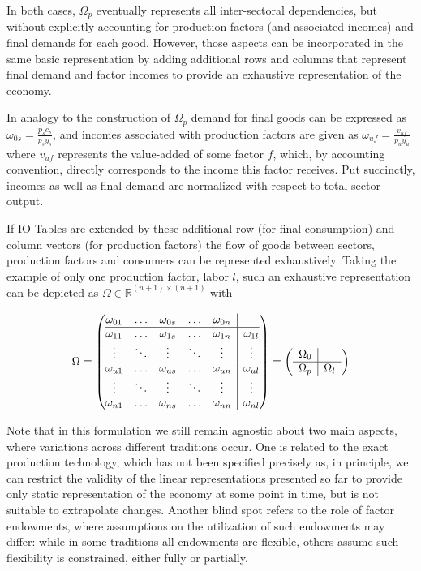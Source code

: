 \documentclass{article}
\begin{document}
In both cases, $\Omega_p$ eventually represents all inter-sectoral dependencies, but without explicitly accounting for production factors (and associated incomes) and final demands for each good. However, those aspects can be incorporated in the same basic representation by adding additional rows and columns that represent final demand and factor incomes to provide an exhaustive representation of the economy. 

In analogy to the construction of $\Omega_p$ demand for final goods can be expressed as $\omega_{0s}=\frac{p_s c_s}{p_s y_s}$, and incomes associated with production factors are given as $\omega_{uf}=\frac{v_{uf}}{p_u y_u}$ where $v_{uf}$ represents the value-added of some factor $f$, which, by accounting convention, directly corresponds to the income this factor receives. Put succinctly, incomes as well as final demand are normalized with respect to total sector output. 

If IO-Tables are extended by these additional row (for final consumption) and column vectors (for production factors) the flow of goods between sectors, production factors and consumers can be represented exhaustively. 
Taking the example of only one production factor, labor $l$, such an exhaustive representation can be depicted as $\Omega \in \mathbb R^{(n+1) \times (n+1)}_+$ with

\begin{align}
  \label{eq:iomatrix}
  \Omega = \left( \begin{array}{@{}ccccc|c@{}}
    \omega_{01} &\dots &\omega_{0s} &\dots &\omega_{0n} &  \\ \hline
    \omega_{11} & \dots & \omega_{1s} & \dots &\omega_{1n} & \omega_{1l}\\ 
    \vdots &\ddots &\vdots  &\ddots & \vdots & \vdots\\ 
    \omega_{u1} & \dots & \omega_{us} & \dots &\omega_{un} & \omega_{ul}\\ 
    \vdots &\ddots &\vdots  &\ddots & \vdots & \vdots\\ 
    \omega_{n1} & \dots &\omega_{ns} & \dots & \omega_{nn} & \omega_{nl}    
    \end{array} \right) = 
    \left( \begin{array}{c|c}
    \Omega_0 & \\ \hline
    \Omega_p & \Omega_l\\ 
  \end{array} \right)
\end{align}

Note that in this formulation we still remain agnostic about two main aspects, where variations across different traditions occur. One is related to the exact production technology, which has not been specified precisely as, in principle, we can restrict the validity of the linear representations presented so far to provide only static representation of the economy at some point in time, but is not suitable to extrapolate changes. Another blind spot refers to the role of factor endowments, where assumptions on the utilization of such endowments may differ: while in some traditions all endowments are flexible, others assume such flexibility is constrained, either fully or partially. 
\end{document}
